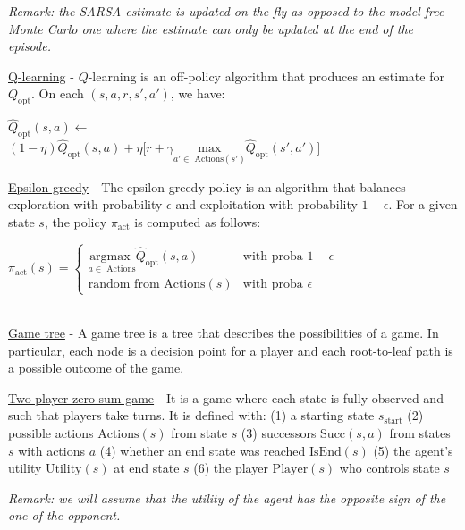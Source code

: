 \documentclass[4pt,landscape]{article}
\begin{document}
\begin{multicols*}{4}
{\textit{Remark: the SARSA estimate is updated on the fly as opposed to the model-free Monte Carlo one where the estimate can only be updated at the end of the episode.}}\par

{\tiny \underline{Q-learning} - $Q$-learning is an off-policy algorithm that produces an estimate for $Q_\textrm{opt}$. On each $(s,a,r,s',a')$, we have:}\par

$\widehat{Q}_{\textrm{opt}}(s,a)\leftarrow$\\$(1-\eta)\widehat{Q}_{\textrm{opt}}(s,a)+\eta\Big[r+\gamma\underset{a'\in\textrm{ Actions}(s')}{\textrm{max}}\widehat{Q}_{\textrm{opt}}(s',a')\Big]$


{\underline{Epsilon-greedy} - The epsilon-greedy policy is an algorithm that balances exploration with probability $\epsilon$ and exploitation with probability $1-\epsilon$. For a given state $s$, the policy $\pi_{\textrm{act}}$ is computed as follows:}\par

${\pi_\textrm{act}(s)=\left\{\begin{array}{ll}\underset{a\in\textrm{ Actions}}{\textrm{argmax }}\widehat{Q}_\textrm{opt}(s,a) & \textrm{with proba }1-\epsilon\\\textrm{random from Actions}(s) & \textrm{with proba }\epsilon\end{array}\right.}$

{\color{cyan} \hrulefill}\\
{\underline{Game tree} - A game tree is a tree that describes the possibilities of a game. In particular, each node is a decision point for a player and each root-to-leaf path is a possible outcome of the game.}\par

{\underline{Two-player zero-sum game} - It is a game where each state is fully observed and such that players take turns. It is defined with:
(1) a starting state $s_{\textrm{start}}$
(2) possible actions $\textrm{Actions}(s)$ from state $s$
(3) successors $\textrm{Succ}(s,a)$ from states $s$ with actions $a$
(4) whether an end state was reached $\textrm{IsEnd}(s)$
(5) the agent's utility $\textrm{Utility}(s)$ at end state $s$
(6) the player $\textrm{Player}(s)$ who controls state $s$}\par
{\textit{Remark: we will assume that the utility of the agent has the opposite sign of the one of the opponent.}}\par


\end{multicols*}
\end{document}
